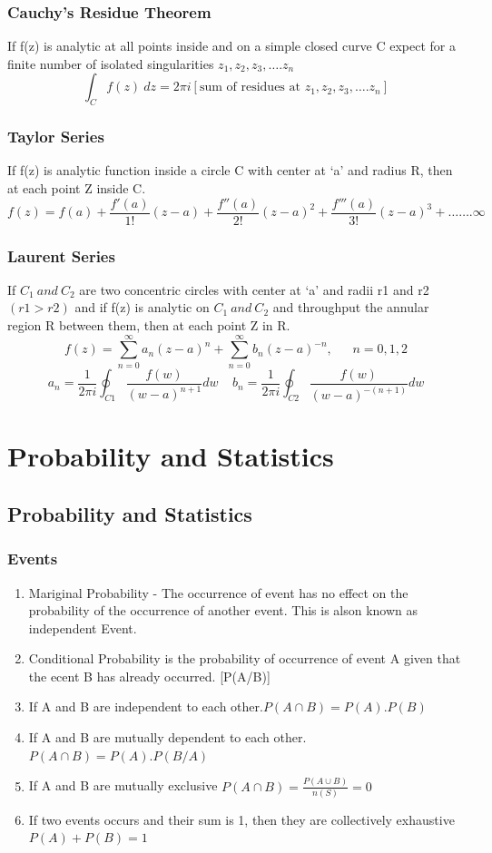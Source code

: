 \subsection*{Cauchy's Residue Theorem}
If f(z) is analytic at all points inside and on a simple closed curve C expect for a finite number of isolated singularities \(z_1, z_2, z_3,\ldots.z_n\)
\[\int_C f(z)\ dz=2\pi i[\text{sum of residues at } z_1, z_2, z_3,\ldots.z_n]\]

\subsection{Taylor Series}
If f(z) is analytic function inside a circle C with center at `a' and radius R, then at each point Z inside C.
\[f(z)=f(a)+\frac{f'(a)}{1!}(z-a)+\frac{f''(a)}{2!}(z-a)^2+\frac{f'''(a)}{3!}(z-a)^3+\ldots\ldots.\infty\]

\subsection{Laurent Series}
If \(C_1\ and\ C_2\) are two concentric circles with center at `a' and radii r1 and r2 \((r1 > r2)\) and if f(z) is analytic on \(C_1\ and\ C_2\) and throughput the annular region R between them, then at each point Z in R.
\[f(z)=\sum_{n=0}^{\infty}a_n(z-a)^n+\sum_{n=0}^{\infty}b_n(z-a)^{-n}, \ \ \ \ \ \ \ n=0, 1, 2\]
\[a_n=\frac{1}{2\pi i}\oint_{C1}\frac{f(w)}{(w-a)^{n+1}}dw\ \ \ \ \ b_n=\frac{1}{2\pi i}\oint_{C2}\frac{f(w)}{(w-a)^{-(n+1)}}dw\]

\chapter*{Probability and Statistics}
\section{Probability and Statistics}

\subsection*{Events}
\begin{enumerate}
    \item Mariginal Probability - The occurrence of event has no effect on the probability of the occurrence of another event. This is alson known as independent Event.
    \item Conditional Probability is the probability of occurrence of event A given that the ecent B has already occurred. [P(A/B)]
    \item If A and B are independent to each other.\(P(A \cap B)=P(A).P(B)\)
    \item If A and B are mutually dependent to each other. \(P(A\cap B)=P(A).P(B/A)\)
    \item If A and B are mutually exclusive \(P(A \cap B)=\frac{P(A\cup B)}{n(S)}=0\)
    \item If two events occurs and their sum is 1, then they are collectively exhaustive\\ \(P(A)+P(B)=1\) 
\end{enumerate}

